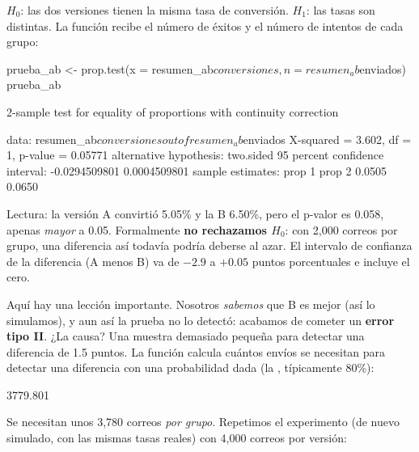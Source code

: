 $H_0$: las dos versiones tienen la misma tasa de conversión. $H_1$: las tasas
son distintas. La función  recibe el número de éxitos y
el número de intentos de cada grupo:

\begin{rcode}
prueba_ab <- prop.test(x = resumen_ab$conversiones,
                       n = resumen_ab$enviados)
prueba_ab
\end{rcode}
\begin{rsalida}
        2-sample test for equality of proportions with continuity
        correction

data:  resumen_ab$conversiones out of resumen_ab$enviados
X-squared = 3.602, df = 1, p-value = 0.05771
alternative hypothesis: two.sided
95 percent confidence interval:
 -0.0294509801  0.0004509801
sample estimates:
prop 1 prop 2
0.0505 0.0650
\end{rsalida}

Lectura: la versión A convirtió 5.05\% y la B 6.50\%, pero el p-valor es
0.058, apenas \emph{mayor} a 0.05. Formalmente \textbf{no rechazamos $H_0$}:
con 2,000 correos por grupo, una diferencia así todavía podría deberse al
azar. El intervalo de confianza de la diferencia (A menos B) va de $-2.9$ a
$+0.05$ puntos porcentuales e incluye el cero.

Aquí hay una lección importante. Nosotros \emph{sabemos} que B es mejor
(así lo simulamos), y aun así la prueba no lo detectó: acabamos de cometer
un \textbf{error tipo II}. ¿La causa? Una muestra demasiado pequeña para
detectar una diferencia de 1.5 puntos. La función 
calcula cuántos envíos se necesitan para detectar una diferencia con una
probabilidad dada (la , típicamente 80\%):

\begin{rsalida}
[1] 3779.801
\end{rsalida}

Se necesitan unos 3,780 correos \emph{por grupo}. Repetimos el experimento
(de nuevo simulado, con las mismas tasas reales) con 4,000 correos por
versión:

